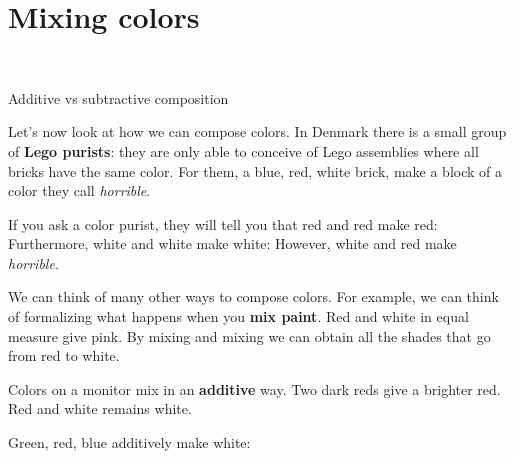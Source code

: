   

\section{Mixing colors}

\begin{marginfigure}
    \centering
    \\
    \caption{Additive vs subtractive composition}
\end{marginfigure}



Let's now look at how we can compose colors.
In Denmark there is a small group of \textbf{Lego purists}: they are only able to conceive of Lego assemblies where all bricks have the same color.
For them, a blue, red, white brick, make a block of a color they call \emph{horrible}.

If you ask a color purist, they will tell you that red and red make red:
%
%
Furthermore, white and white make white:
%
%
However, white and red make \emph{horrible}.
%



We can think of many other ways to compose colors.
For example, we can think of formalizing what happens when you \textbf{mix paint}.
Red and white in equal measure give pink.
By mixing and mixing we can obtain all the shades that go from red to white.
\begin{widepar}
    \begin{center}
    \end{center}
\end{widepar}
Colors on a monitor mix in an \textbf{additive} way. Two dark reds give a brighter red.
Red and white remains white.
\begin{widepar}
    \begin{center}
\end{center}
\end{widepar}
Green, red, blue additively make white:

